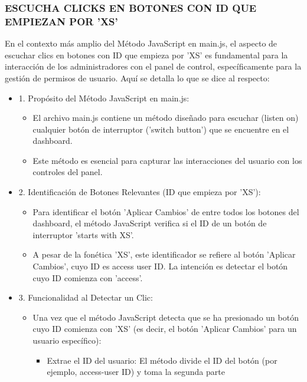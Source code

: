 \documentclass{report}
\begin{document}
\subsubsection{ESCUCHA CLICKS EN BOTONES CON ID QUE EMPIEZAN POR 'XS'}
En el contexto más amplio del Método JavaScript en main.js, el aspecto de escuchar clics en botones con ID que empieza por 'XS' 
es fundamental para la interacción de los administradores con el panel de control, específicamente para la gestión de permisos de usuario.
Aquí se detalla lo que se dice al respecto:
\begin{itemize}
    \item 1. Propósito del Método JavaScript en main.js:
        \begin{itemize}
            \item El archivo main.js contiene un método diseñado para escuchar (listen on) cualquier botón de interruptor ('switch button') 
            que se encuentre en el dashboard.
            \item Este método es esencial para capturar las interacciones del usuario con los controles del panel.        
        \end{itemize}
    \item 2. Identificación de Botones Relevantes (ID que empieza por 'XS'):
        \begin{itemize}
            \item Para identificar el botón 'Aplicar Cambios' de entre todos los botones del dashboard, el método JavaScript verifica si el 
            ID de un botón de interruptor 'starts with XS'.
            \item A pesar de la fonética 'XS', este identificador se refiere al botón 'Aplicar Cambios', cuyo ID es access user ID. La 
            intención es detectar el botón cuyo ID comienza con 'access'.            
        \end{itemize}
    \item 3. Funcionalidad al Detectar un Clic:
        \begin{itemize}
            \item Una vez que el método JavaScript detecta que se ha presionado un botón cuyo ID comienza con 'XS' (es decir, el botón 
            'Aplicar Cambios' para un usuario específico):
                \begin{itemize}
                    \item Extrae el ID del usuario: El método divide el ID del botón (por ejemplo, access-user ID) y toma la segunda parte 

\end{itemize}
\end{itemize}
\end{itemize}
\end{document}
